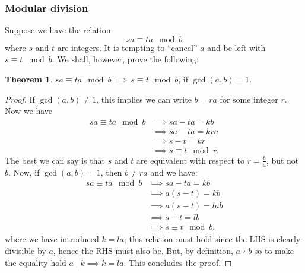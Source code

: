 \documentclass[]{scrartcl}
\theoremstyle{definition}
\newtheorem{thm}{Theorem}
\begin{document}
\subsubsection{Modular division}
Suppose we have the relation
\begin{equation}
    sa \equiv ta \mod b
\end{equation}
where $s$ and $t$ are integers. It is tempting to ``cancel'' $a$ and be left with $s \equiv t \mod b$. We shall, however, prove the following:
\begin{thm}
    $sa \equiv ta \mod b \, \implies \, s \equiv t \mod b$, if $\gcd(a,b) = 1$.
\end{thm}
\begin{proof}
    If $\gcd(a,b) \neq 1$, this implies we can write $b = ra$ for some integer $r$. Now we have
    \begin{align*}
        sa \equiv ta \mod b & \implies sa - ta = kb \\
        & \implies sa - ta = kra \\
        & \implies s - t = kr \\
        & \implies s \equiv t \mod r.
    \end{align*}
    The best we can say is that $s$ and $t$ are equivalent with respect to $r=\frac{b}{a}$, but not $b$. Now, if $\gcd(a, b) = 1$, then $b\neq ra$ and we have:
    \begin{align*}
        sa \equiv ta \mod b & \implies sa - ta = kb \\
        & \implies a(s-t) = kb \\
        & \implies a(s-t) = lab \\
        & \implies s - t = lb \\
        & \implies s \equiv t \mod b,
    \end{align*}
    where we have introduced $k=la$; this relation must hold since the LHS is clearly divisible by $a$, hence the RHS must also be. But, by definition, $a\nmid b$ so to make the equality hold $a\mid k \implies k=la$. This concludes the proof.
\end{proof}
\end{document}
